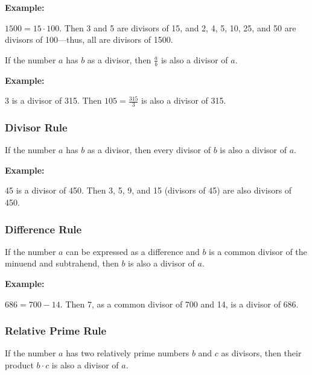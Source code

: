 \textbf{Example:}
\vspace{\baselineskip}

\( 1500 = 15 \cdot 100 \). Then 3 and 5 are divisors of 15, and 2, 4, 5, 10, 25, and 50 are divisors of 
100—thus, all are divisors of 1500.


If the number \( a \) has \( b \) as a divisor, then \( \frac{a}{b} \) is also a divisor of \( a \).
\vspace{\baselineskip}

\textbf{Example:}
\vspace{\baselineskip}
 
3 is a divisor of 315. Then \( 105 = \frac{315}{3} \) is also a divisor of 315.

\subsubsection{Divisor Rule}

If the number \( a \) has \( b \) as a divisor, then every divisor of \( b \) is also a divisor of 
\( a \).
\vspace{\baselineskip}

\textbf{Example:}
\vspace{\baselineskip}
 
45 is a divisor of 450. Then 3, 5, 9, and 15 (divisors of 45) are also divisors of 450.

\subsubsection{Difference Rule}

If the number \( a \) can be expressed as a difference and \( b \) is a common divisor of the minuend 
and subtrahend, then \( b \) is also a divisor of \( a \). \\
\vspace{\baselineskip}

\textbf{Example:}
\vspace{\baselineskip}

\( 686 = 700 - 14 \). Then 7, as a common divisor of 700 and 14, is a divisor of 686.

\subsubsection{Relative Prime Rule}

If the number \( a \) has two relatively prime numbers \( b \) and \( c \) as divisors, then their 
product \( b \cdot c \) is also a divisor of \( a \). \\
\vspace{\baselineskip}

